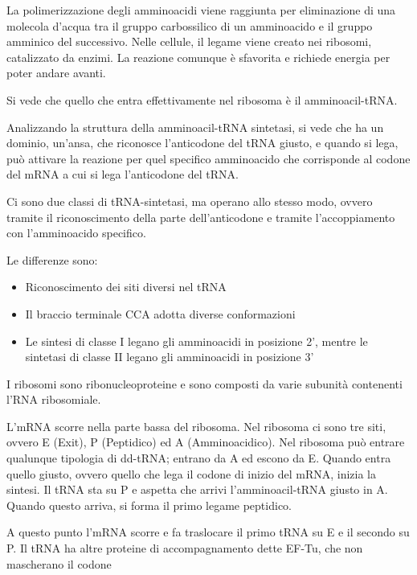 La polimerizzazione degli amminoacidi viene raggiunta per eliminazione di una molecola d'acqua tra il gruppo carbossilico di un amminoacido e il gruppo amminico del successivo. Nelle cellule, il legame viene creato nei ribosomi, catalizzato da enzimi. La reazione comunque è sfavorita e richiede energia per poter andare avanti.

Si vede che quello che entra effettivamente nel ribosoma è il amminoacil-tRNA.

Analizzando la struttura della amminoacil-tRNA sintetasi, si vede che ha un dominio, un'ansa, che riconosce l'anticodone del tRNA giusto, e quando si lega, può attivare la reazione per quel specifico amminoacido che corrisponde al codone del mRNA a cui si lega l'anticodone del tRNA.

Ci sono due classi di tRNA-sintetasi, ma operano allo stesso modo, ovvero tramite il riconoscimento della parte dell'anticodone e tramite l'accoppiamento con l'amminoacido specifico.

\clearpage

Le differenze sono:
\begin{itemize}
\item Riconoscimento dei siti diversi nel tRNA
\item Il braccio terminale CCA adotta diverse conformazioni
\item Le sintesi di classe I legano gli amminoacidi in posizione 2', mentre le sintetasi di classe II legano gli amminoacidi in posizione 3'
\end{itemize}

I ribosomi sono ribonucleoproteine e sono composti da varie subunità contenenti l'RNA ribosomiale.

L'mRNA scorre nella parte bassa del ribosoma. Nel ribosoma ci sono tre siti, ovvero E (Exit), P (Peptidico) ed A (Amminoacidico). Nel ribosoma può entrare qualunque tipologia di dd-tRNA; entrano da A ed escono da E. Quando entra quello giusto, ovvero quello che lega il codone di inizio del mRNA, inizia la sintesi. Il tRNA sta su P e aspetta che arrivi l'amminoacil-tRNA giusto in A. Quando questo arriva, si forma il primo legame peptidico.

A questo punto l'mRNA scorre e fa traslocare il primo tRNA su E e il secondo su P.
Il tRNA ha altre proteine di accompagnamento dette EF-Tu, che non mascherano il codone



